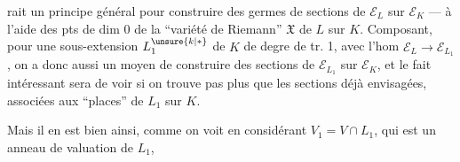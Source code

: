
rait un principe général pour construire des germes de sections de $\mathcal E_L$ sur $\mathcal E_K$ --- à l'aide des pts de dim 0 de la ``variété de Riemann'' $\mathfrak X$ de $L$ sur $K$. Composant, pour une sous-extension $L_1^{\unsure{k|*}}$ de $K$ de degre de tr. 1, avec l'hom $\mathcal E_L\longrightarrow\mathcal E_{L_1}$, on a donc aussi un moyen de construire des  sections de $\mathcal E_{L_1}$ sur $\mathcal E_K$, et le fait intéressant sera de voir si on  trouve pas plus que les sections déjà envisagées, associées aux ``places'' de $L_1$ sur $K$.

Mais il en est bien ainsi, comme on voit en considérant $V_1=V\cap L_1$, qui est un anneau de valuation de $L_1$,
